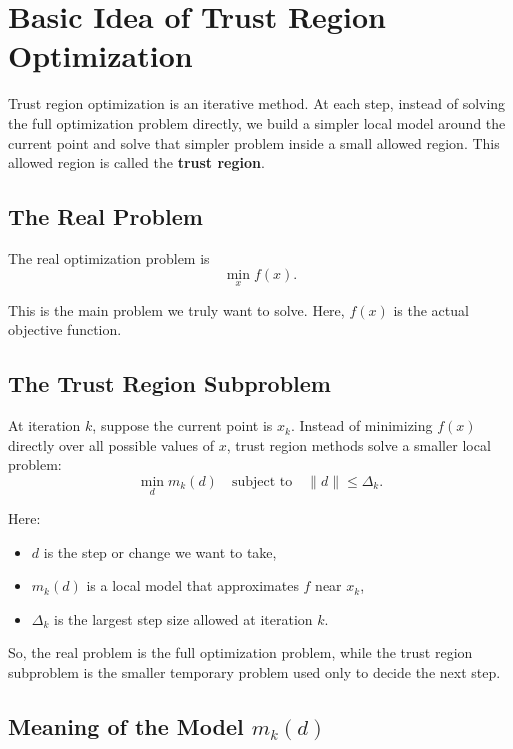 \documentclass{article}
\begin{document}
\section{Basic Idea of Trust Region Optimization}

Trust region optimization is an iterative method. At each step, instead of solving the full optimization problem directly, we build a simpler local model around the current point and solve that simpler problem inside a small allowed region. This allowed region is called the \textbf{trust region}.

\subsection{The Real Problem}

The real optimization problem is
\begin{equation}
\min_x f(x).
\end{equation}

This is the main problem we truly want to solve. Here, $f(x)$ is the actual objective function.

\subsection{The Trust Region Subproblem}

At iteration $k$, suppose the current point is $x_k$. Instead of minimizing $f(x)$ directly over all possible values of $x$, trust region methods solve a smaller local problem:
\begin{equation}
\min_d m_k(d)
\quad \text{subject to} \quad \|d\| \leq \Delta_k.
\end{equation}

Here:
\begin{itemize}
    \item $d$ is the step or change we want to take,
    \item $m_k(d)$ is a local model that approximates $f$ near $x_k$,
    \item $\Delta_k$ is the largest step size allowed at iteration $k$.
\end{itemize}

So, the real problem is the full optimization problem, while the trust region subproblem is the smaller temporary problem used only to decide the next step.

\subsection{Meaning of the Model $m_k(d)$}
\end{document}
